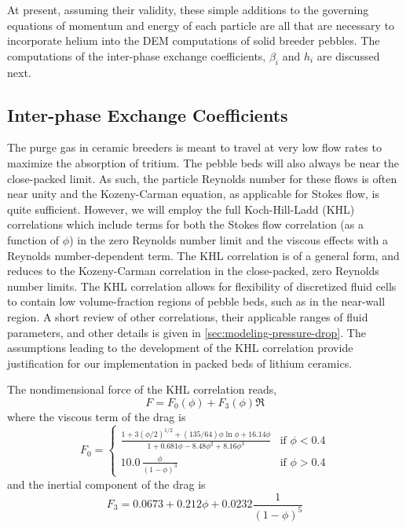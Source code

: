 At present, assuming their validity, these simple additions to the governing equations of momentum and energy of each particle are all that are necessary to incorporate helium into the DEM computations of solid breeder pebbles. The computations of the inter-phase exchange coefficients, $\beta_i$ and $h_i$ are discussed next.

\subsection{Inter-phase Exchange Coefficients}

The purge gas in ceramic breeders is meant to travel at very low flow rates to maximize the absorption of tritium. The pebble beds will also always be near the close-packed limit. As such, the particle Reynolds number for these flows is often near unity and the Kozeny-Carman equation, as applicable for Stokes flow, is quite sufficient. However, we will employ the full Koch-Hill-Ladd (KHL) correlations which include terms for both the Stokes flow correlation (as a function of $\phi$) in the zero Reynolds number limit and the viscous effects with a Reynolds number-dependent term. The KHL correlation is of a general form, and reduces to the Kozeny-Carman correlation in the close-packed, zero Reynolds number limits.\cite{Koch2001} The KHL correlation allows for flexibility of discretized fluid cells to contain low volume-fraction regions of pebble beds, such as in the near-wall region. A short review of other correlations, their applicable ranges of fluid parameters, and other details is given in \cref{sec:modeling-pressure-drop}. The assumptions leading to the development of the KHL correlation provide justification for our implementation in packed beds of lithium ceramics.

The nondimensional force of the KHL correlation reads,
\begin{equation}\label{eq:khl-correlation}
	F = F_0(\phi) + F_3(\phi)\Re
\end{equation}
where the viscous term of the drag is
\begin{equation}
F_0 = \begin{cases}
	\frac{1+3(\phi/2)^{1/2} + (135/64)\phi\ln\phi + 16.14\phi}{1 + 0.681\phi - 8.48 \phi^2 + 8.16\phi^3} & \text{if $\phi < 0.4$}\\
	10.0\,\frac{\phi}{(1-\phi)^3} & \text{if $\phi > 0.4$} 
	\end{cases}
\end{equation}
and the inertial component of the drag is
\begin{equation}
	F_3 = 0.0673 + 0.212\phi + 0.0232 \frac{1}{(1-\phi)^5}
\end{equation}

